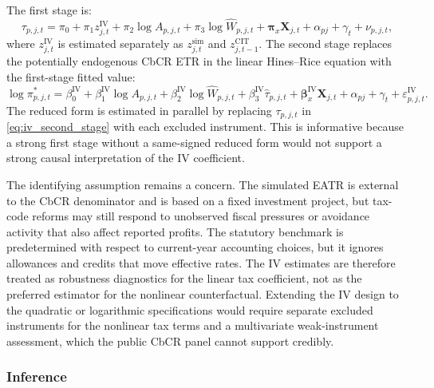\documentclass[11pt,a4paper]{article}
\begin{document}
The first stage is:
\begin{equation}\label{eq:iv_first_stage}
\tau_{p,j,t} = \pi_0 + \pi_1 z_{j,t}^{\text{IV}} + \pi_2 \log A_{p,j,t} + \pi_3 \log \hat{W}_{p,j,t} + \mathbf{\pi}_x \mathbf{X}_{j,t} + \alpha_{pj} + \gamma_t + \nu_{p,j,t},
\end{equation}
where $z_{j,t}^{\text{IV}}$ is estimated separately as $z_{j,t}^{\text{sim}}$ and $z_{j,t-1}^{\text{CIT}}$.
The second stage replaces the potentially endogenous CbCR ETR in the linear Hines--Rice equation with the first-stage fitted value:
\begin{equation}\label{eq:iv_second_stage}
\log \pi_{p,j,t}^{*} = \beta_0^{\text{IV}} + \beta_1^{\text{IV}} \log A_{p,j,t} + \beta_2^{\text{IV}} \log \hat{W}_{p,j,t} + \beta_3^{\text{IV}} \widehat{\tau}_{p,j,t} + \mathbf{\beta}_x^{\text{IV}} \mathbf{X}_{j,t} + \alpha_{pj} + \gamma_t + \varepsilon_{p,j,t}^{\text{IV}}.
\end{equation}
The reduced form is estimated in parallel by replacing $\tau_{p,j,t}$ in \eqref{eq:iv_second_stage} with each excluded instrument. This is informative because a strong first stage without a same-signed reduced form would not support a strong causal interpretation of the IV coefficient.

The identifying assumption remains a concern. The simulated EATR is external to the CbCR denominator and is based on a fixed investment project, but tax-code reforms may still respond to unobserved fiscal pressures or avoidance activity that also affect reported profits. The statutory benchmark is predetermined with respect to current-year accounting choices, but it ignores allowances and credits that move effective rates. The IV estimates are therefore treated as robustness diagnostics for the linear tax coefficient, not as the preferred estimator for the nonlinear counterfactual. Extending the IV design to the quadratic or logarithmic specifications would require separate excluded instruments for the nonlinear tax terms and a multivariate weak-instrument assessment, which the public CbCR panel cannot support credibly.

\subsubsection{Inference}\label{sec:inference}
\end{document}
